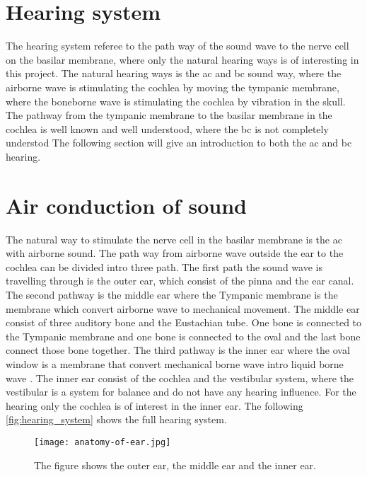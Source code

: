 \section{Hearing system}
The hearing system referee to the path way of the sound wave to the nerve cell on the basilar membrane, where only the natural hearing ways is of interesting in this project. The natural hearing ways is the \gls{ac} and \gls{bc} sound way, where the airborne wave is stimulating the cochlea by moving the tympanic membrane, where the boneborne wave is stimulating the cochlea by vibration in the skull. The pathway from the tympanic membrane to the basilar membrane in the cochlea is well known and well understood, where the \gls{bc} is not completely understod \citep{stenfelt_2005} The following section will give an introduction to both the \gls{ac} and \gls{bc} hearing.


\section{Air conduction of sound}
The natural way to stimulate the nerve cell in the basilar membrane is the \gls{ac} with airborne sound. The path way from airborne wave outside the ear to the cochlea can be divided intro three path. The first path the sound wave is travelling through is the outer ear, which consist of the pinna and the ear canal. The second pathway is the middle ear where the Tympanic membrane is the membrane which convert airborne wave to mechanical movement. The middle ear consist of three auditory bone and the Eustachian tube. One bone is connected to the Tympanic membrane and one bone is connected to the oval and the last bone connect those bone together. The third pathway is the inner ear where the oval window is a membrane that convert mechanical borne wave intro liquid borne wave \citep{ho_2017}. The inner ear consist of the cochlea and the vestibular system, where the vestibular is a system for balance and do not have any hearing influence. For the hearing only the cochlea is of interest in the inner ear. The following \autoref{fig:hearing_system} shows the full hearing system.


 \begin{figure}[H]
	\centering
		\texttt{[image: anatomy-of-ear.jpg]}
		\caption{The figure shows the outer ear, the middle ear and the inner ear.}
		\label{fig:hearing_system}
\end{figure}

